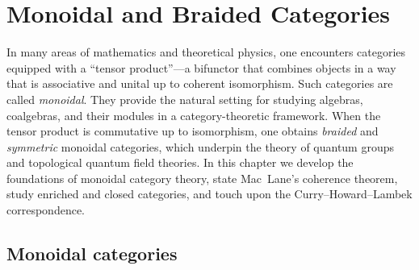 

\chapter{Monoidal and Braided Categories}\label{ch:monoidal}
\minitoc

\vspace{1em}

In many areas of mathematics and theoretical physics, one encounters
categories equipped with a ``tensor product''---a bifunctor that combines
objects in a way that is associative and unital up to coherent isomorphism.
Such categories are called \emph{monoidal}.  They provide the natural
setting for studying algebras, coalgebras, and their modules in a
category-theoretic framework.  When the tensor product is commutative
up to isomorphism, one obtains \emph{braided} and \emph{symmetric} monoidal
categories, which underpin the theory of quantum groups and topological
quantum field theories.  In this chapter we develop the foundations of
monoidal category theory, state Mac~Lane's coherence theorem, study
enriched and closed categories, and touch upon the Curry--Howard--Lambek
correspondence.


\section{Monoidal categories}\label{sec:monoidal-cats}

